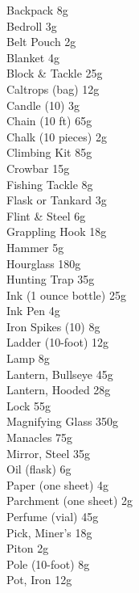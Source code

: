 \documentclass[10pt,twoside]{article}
\begin{document}
\begin{multicols}{3}
\small
Backpack \dotfill 8g \\
Bedroll \dotfill 3g \\
Belt Pouch \dotfill 2g \\
Blanket \dotfill 4g \\
Block \& Tackle \dotfill 25g \\
Caltrops (bag) \dotfill 12g \\
Candle (10) \dotfill 3g \\
Chain (10 ft) \dotfill 65g \\
Chalk (10 pieces) \dotfill 2g \\
Climbing Kit \dotfill 85g \\
Crowbar \dotfill 15g \\
Fishing Tackle \dotfill 8g \\
Flask or Tankard \dotfill 3g \\
Flint \& Steel \dotfill 6g \\
Grappling Hook \dotfill 18g \\
Hammer \dotfill 5g \\
Hourglass \dotfill 180g \\
Hunting Trap \dotfill 35g \\
Ink (1 ounce bottle) \dotfill 25g \\
Ink Pen \dotfill 4g \\
Iron Spikes (10) \dotfill 8g \\
Ladder (10-foot) \dotfill 12g \\
Lamp \dotfill 8g \\
Lantern, Bullseye \dotfill 45g \\
Lantern, Hooded \dotfill 28g \\
Lock \dotfill 55g \\
Magnifying Glass \dotfill 350g \\
Manacles \dotfill 75g \\
Mirror, Steel \dotfill 35g \\
Oil (flask) \dotfill 6g \\
Paper (one sheet) \dotfill 4g \\
Parchment (one sheet) \dotfill 2g \\
Perfume (vial) \dotfill 45g \\
Pick, Miner's \dotfill 18g \\
Piton \dotfill 2g \\
Pole (10-foot) \dotfill 8g \\
Pot, Iron \dotfill 12g \\

\end{multicols}
\end{document}
